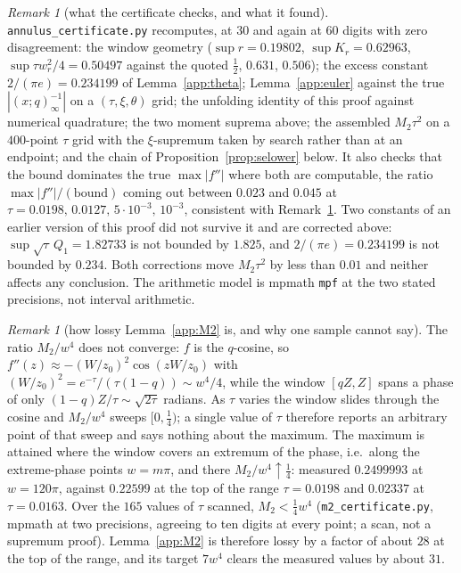 \documentclass[11pt]{article}
\theoremstyle{plain}
\theoremstyle{definition}
\theoremstyle{remark}
\newtheorem{remark}[theorem]{Remark}
\begin{document}
\begin{remark}[what the certificate checks, and what it found]\label{rem:M2cert}
\texttt{annulus\_certificate.py} recomputes, at $30$ and again at $60$ digits with zero
disagreement: the window geometry ($\sup r=0.19802$, $\sup K_r=0.62963$, $\sup\tau w_r^2/4=0.50497$
against the quoted $\tfrac12$, $0.631$, $0.506$); the excess constant $2/(\pi e)=0.234199$ of
Lemma~\ref{app:theta}; Lemma~\ref{app:euler} against the true $|(x;q)_\infty^{-1}|$ on a
$(\tau,\xi,\theta)$ grid; the unfolding identity of this proof against numerical quadrature; the
two moment suprema above; the assembled $M_2\tau^2$ on a $400$-point $\tau$ grid with the
$\xi$-supremum taken by search rather than at an endpoint; and the chain of
Proposition~\ref{prop:selower} below. It also checks that the bound dominates the true
$\max|f''|$ where both are computable, the ratio $\max|f''|/(\text{bound})$ coming out between
$0.023$ and $0.045$ at $\tau=0.0198,\,0.0127,\,5\cdot10^{-3},\,10^{-3}$, consistent with
Remark~\ref{rem:M2sharp}. Two constants of an earlier version of this proof did not survive it and
are corrected above: $\sup\sqrt\tau\,Q_1=1.82733$ is not bounded by $1.825$, and
$2/(\pi e)=0.234199$ is not bounded by $0.234$. Both corrections move $M_2\tau^2$ by less than
$0.01$ and neither affects any conclusion. The arithmetic model is mpmath \texttt{mpf} at the two
stated precisions, not interval arithmetic.
\end{remark}

\begin{remark}[how lossy Lemma~\ref{app:M2} is, and why one sample cannot say]\label{rem:M2sharp}
The ratio $M_2/w^4$ does not converge: $f$ is the $q$-cosine, so
$f''(z)\approx-(W/z_0)^2\cos(zW/z_0)$ with $(W/z_0)^2=e^{-\tau}/(\tau(1-q))\sim w^4/4$, while the
window $[qZ,Z]$ spans a phase of only $(1-q)Z/\tau\sim\sqrt{2\tau}$ radians. As $\tau$ varies the
window slides through the cosine and $M_2/w^4$ sweeps $[0,\tfrac14)$; a single value of $\tau$
therefore reports an arbitrary point of that sweep and says nothing about the maximum. The maximum
is attained where the window covers an extremum of the phase, i.e.\ along the extreme-phase points
$w=m\pi$, and there $M_2/w^4\uparrow\tfrac14$: measured $0.2499993$ at $w=120\pi$, against
$0.22599$ at the top of the range $\tau=0.0198$ and $0.02337$ at $\tau=0.0163$. Over the
$165$ values of $\tau$ scanned, $M_2<\tfrac14w^4$ (\texttt{m2\_certificate.py}, mpmath at two
precisions, agreeing to ten digits at every point; a scan, not a supremum proof). Lemma~\ref{app:M2}
is therefore lossy by a factor of about $28$ at the top of the range, and its target $7w^4$ clears
the measured values by about $31$.
\end{remark}
\end{document}
